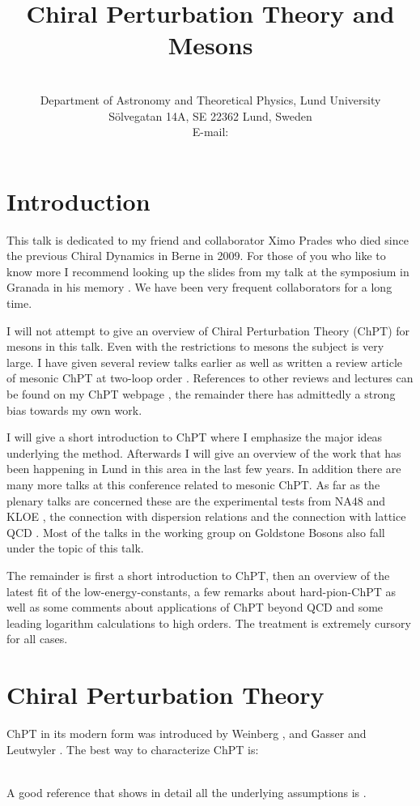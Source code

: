 \documentclass[cits,hyper]{PoS}
\title{Chiral Perturbation Theory and Mesons}
\author{\speaker{Johan Bijnens}\\
        Department of Astronomy and Theoretical Physics, Lund University\\
        S\"olvegatan 14A, SE 22362 Lund, Sweden\\
        E-mail: \email{bijnens@thep.lu.se}}
\begin{document}
\section{Introduction}

This talk is dedicated to my friend and collaborator Ximo Prades who died
since the previous Chiral Dynamics in Berne in 2009. For those of you who
like to know more I recommend looking up the slides from my talk at the
symposium in Granada in his memory \cite{Ximo}. We have been very frequent
collaborators for a long time.

I will not attempt to give an overview of Chiral Perturbation Theory (ChPT)
for mesons in this talk. Even with the restrictions to mesons the subject is
very large. I have given several review talks earlier
\cite{talk1,talk2} as well as written a review article of mesonic ChPT
at two-loop order \cite{review}. References to other reviews and lectures
can be found on my ChPT webpage \cite{webpage}, the remainder there
has admittedly a strong bias towards my own work.

I will give a short introduction to ChPT where I emphasize the major ideas
underlying the method. Afterwards I will give an overview of the work that
has been happening in Lund in this area in the last few years. In addition there
are many more talks at this conference related to mesonic ChPT. As far as the
plenary talks are concerned these are the experimental tests from NA48 \cite{Bizzetti} and KLOE \cite{Bossi}, the connection with dispersion relations
\cite{Lanz,Caprini} and the connection with lattice QCD
\cite{Lellouch,Sachrajda,Izubuchi}. Most of the talks in the working group on
Goldstone Bosons also fall under the topic of this talk.

The remainder is first a short introduction to ChPT, then an overview
of the latest fit of the low-energy-constants,
a few remarks about hard-pion-ChPT as well as some comments about
applications of ChPT beyond QCD and some
leading logarithm calculations to high orders. The treatment is extremely
cursory for all cases.

\section{Chiral Perturbation Theory}

ChPT in its modern form was introduced by Weinberg \cite{Weinberg0}, and
Gasser and Leutwyler \cite{GL1,GL2}. The best way to characterize
ChPT is:\\[1mm]
\centerline{}\\[1mm]
A good reference that shows in detail all the underlying assumptions is
\cite{Leutwyler1}.
\end{document}
